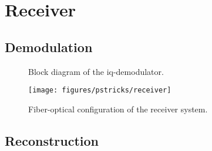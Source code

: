 \section{Receiver}


\subsection{Demodulation}

\begin{figure}[htb]
	\centering
	
	\caption{Block diagram of the \gls{iq}-demodulator.}
\end{figure}

\begin{figure}[htb]
	\centering
	\texttt{[image: figures/pstricks/receiver]}
	\caption{Fiber-optical configuration of the receiver system.}
\end{figure}

\subsection{Reconstruction}

